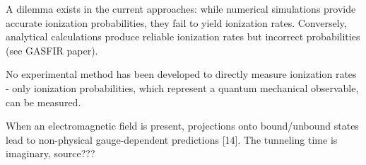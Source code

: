 A dilemma exists in the current approaches: while numerical simulations provide accurate ionization probabilities, they fail to yield ionization rates. 
Conversely, analytical calculations produce reliable ionization rates but incorrect probabilities (see GASFIR paper).

No experimental method has been developed to directly measure ionization rates - only ionization probabilities, which represent a quantum mechanical observable, can be measured.

When an electromagnetic field is present, projections onto bound/unbound states lead to non-physical gauge-dependent predictions [14]. %
The tunneling time is imaginary, source??? %












